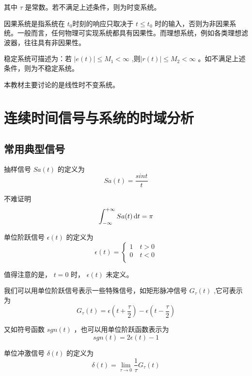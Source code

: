 \documentclass[UTF8,a4paper,11pt]{article}
\begin{document}
其中 $\tau$ 是常数。若不满足上述条件，则为时变系统。

因果系统是指系统在 $t_0$时刻的响应只取决于 $t\leq t_0$ 时的输入，否则为非因果系统。一般而言，任何物理可实现系统都具有因果性。而理想系统，例如各类理想滤波器，往往具有非因果性。

稳定系统可描述为：若 $\left | e(t) \right |\leq M_1<\infty$ ,则$\left | r(t) \right |\leq M_2<\infty$ 。如不满足上述条件，则为不稳定系统。

本教材主要讨论的是线性时不变系统。

\section{连续时间信号与系统的时域分析}
\subsection{常用典型信号}
抽样信号 $Sa(t)$ 的定义为
\begin{equation}
Sa(t)=\frac{sint}{t}
\end{equation}

不难证明
\begin{equation}
\int_{-\infty}^{+\infty} {Sa(t)} \,{\rm d}t=\pi
\end{equation}

单位阶跃信号 $\epsilon(t)$ 的定义为
\begin{equation}
\epsilon(t)=
\begin{cases}
1\quad t>0 \\
0\quad t<0 \\
\end{cases}
\label{pythagorean}
\end{equation}

值得注意的是， $t=0$ 时， $\epsilon(t)$ 未定义。

我们可以用单位阶跃信号表示一些特殊信号，如矩形脉冲信号 $G_{\tau}(t)$ ,它可表示为
\begin{equation}
G_{\tau}(t)=\epsilon(t+\frac{\tau}{2})-\epsilon(t-\frac{\tau}{2}) \label{pythagorean}
\end{equation}

又如符号函数 $sgn(t)$ ，也可以用单位阶跃函数表示为
\begin{equation}
sgn(t)=2\epsilon(t)-1
\end{equation}

单位冲激信号 $\delta(t)$ 的定义为
\begin{equation}
\delta(t)=\lim_{\tau \to 0}\frac{1}{\tau}G_{\tau}(t)
\end{equation}
\end{document}

